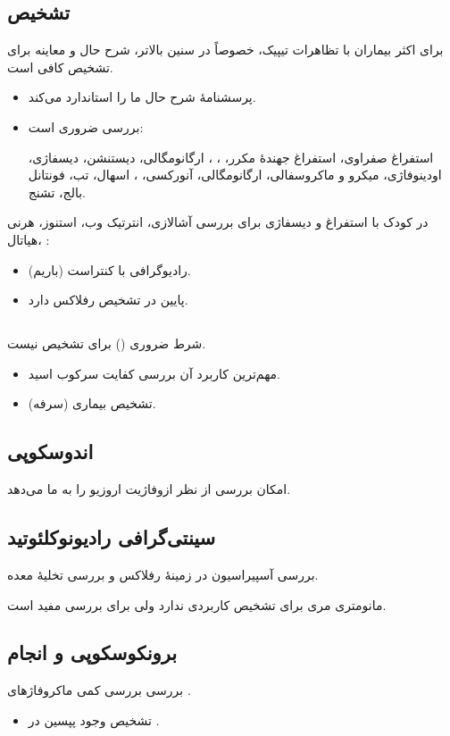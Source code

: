 \documentclass[12pt,a4paper]{article}
\begin{document}
\subsection*{تشخیص}
برای اکثر بیماران با تظاهرات تیپیک، خصوصاً در سنین بالاتر، شرح حال و معاینه برای تشخیص کافی است.
\begin{itemize}
\item پرسشنامهٔ  شرح حال ما را استاندارد می‌کند.
\item بررسی  ضروری است:
\par استفراغ صفراوی، استفراغ جهندهٔ مکرر، ، ، ارگانومگالی، دیستنشن، دیسفاژی، اودینوفاژی، میکرو و ماکروسفالی، ارگانومگالی، آنورکسی، ، اسهال، تب، فونتانل بالج، تشنج.
\end{itemize}
در کودک با استفراغ و دیسفاژی برای بررسی آشالازی، انترتیک وب، استنوز، هرنی هیاتال، :
\begin{itemize}
\item رادیوگرافی با کنتراست (باریم).
\item {} پایین در تشخیص رفلاکس دارد.
\end{itemize}

\subsection*{}
شرط ضروری () برای تشخیص  نیست.
\begin{itemize}
\item مهم‌ترین کاربرد آن \GERDArrow{} بررسی کفایت سرکوب اسید.
\item تشخیص بیماری  (سرفه).
\end{itemize}

\subsection*{اندوسکوپی}
امکان بررسی از نظر ازوفاژیت اروزیو را به ما می‌دهد.

\subsection*{سینتی‌گرافی رادیونوکلئوتید}
بررسی آسپیراسیون در زمینهٔ رفلاکس و بررسی تخلیهٔ معده.

مانومتری مری برای تشخیص  کاربردی ندارد ولی برای بررسی  مفید است.

\subsection*{برونکوسکوپی و انجام }
بررسی  \GERDArrow{} بررسی کمی ماکروفاژهای .
\begin{itemize}
\item تشخیص وجود پپسین در .
\end{itemize}
\end{document}
